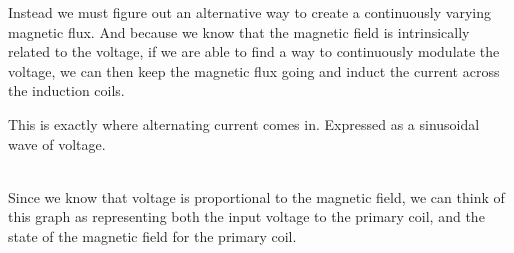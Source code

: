 \documentclass[12pt]{article}
\begin{document}
Instead we must figure out an alternative way to create a continuously varying magnetic flux. And because we know that the magnetic field is intrinsically related to the voltage, if we are able to find a way to continuously modulate the voltage,  we can then keep the magnetic flux going and induct the current across the induction coils.

This is exactly where alternating current comes in. Expressed as a sinusoidal wave of voltage.
\vspace{5mm}\\
\vspace{5mm}\\
Since we know that voltage is proportional to the magnetic field, we can think of this graph as representing both the input voltage to the primary coil, and the state of the magnetic field for the primary coil. 
\end{document}
